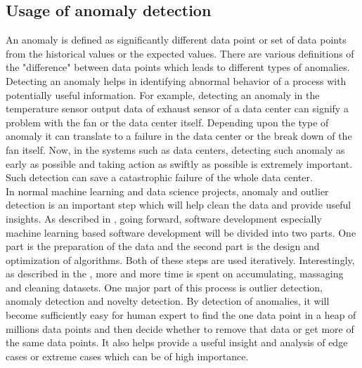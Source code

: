 \documentclass[12pt]{article}
\begin{document}
\subsection{Usage of anomaly detection}
An anomaly is defined as significantly different data point or set of data points from the historical values or the expected values. There are various definitions of the "difference" between data points which leads to different types of anomalies. Detecting an anomaly helps in identifying abnormal behavior of a process with potentially useful information. For example, detecting an anomaly in the temperature sensor output data of exhaust sensor of a data center can signify a problem with the fan or the data center itself. Depending upon the type of anomaly it can translate to a failure in the data center or the break down of the fan itself. Now, in the systems such as data centers, detecting such anomaly as early as possible and taking action as swiftly as possible is extremely important. Such detection can save a catastrophic failure of the whole data center.\\
\break In normal machine learning and data science projects, anomaly and outlier detection is an important step which will help clean the data and provide useful insights. As described in \cite{Software2}, going forward, software development especially machine learning based software development will be divided into two parts. One part is the preparation of the data and the second part is the design and optimization of algorithms. Both of these steps are used iteratively. Interestingly, as described in the \cite{Software2}, more and more time is spent on accumulating, massaging and cleaning datasets. One major part of this process is outlier detection, anomaly detection and novelty detection. By detection of anomalies, it will become sufficiently easy for human expert to find the one data point in a heap of millions data points and then decide whether to remove that data or get more of the same data points. It also helps provide a useful insight and analysis of edge cases or extreme cases which can be of high importance.
\end{document}
